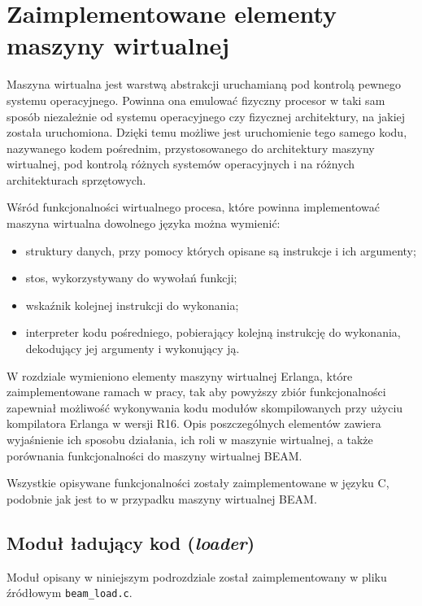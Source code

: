 \chapter{Zaimplementowane elementy maszyny wirtualnej}
\label{cha:maszyna}

Maszyna wirtualna jest warstwą abstrakcji uruchamianą pod kontrolą pewnego systemu operacyjnego.
Powinna ona emulować fizyczny procesor w taki sam sposób niezależnie od systemu operacyjnego czy fizycznej architektury, na jakiej została uruchomiona.
Dzięki temu możliwe jest uruchomienie tego samego kodu, nazywanego kodem pośrednim, przystosowanego do architektury maszyny wirtualnej, pod kontrolą różnych systemów operacyjnych i na różnych architekturach sprzętowych.

Wśród funkcjonalności wirtualnego procesa, które powinna implementować maszyna wirtualna dowolnego języka można wymienić:
\begin{itemize}
\item struktury danych, przy pomocy których opisane są instrukcje i ich argumenty;
\item stos, wykorzystywany do wywołań funkcji;
\item wskaźnik kolejnej instrukcji do wykonania;
\item interpreter kodu pośredniego, pobierający kolejną instrukcję do wykonania, dekodujący jej argumenty i wykonujący ją.
\end{itemize}

W rozdziale wymieniono elementy maszyny wirtualnej Erlanga, które zaimplementowane ramach w pracy, tak aby powyższy zbiór funkcjonalności zapewniał możliwość wykonywania kodu modułów skompilowanych przy użyciu kompilatora Erlanga w wersji R16.
Opis poszczególnych elementów zawiera wyjaśnienie ich sposobu działania, ich roli w maszynie wirtualnej, a także porównania
funkcjonalności do maszyny wirtualnej BEAM.

Wszystkie opisywane funkcjonalności zostały zaimplementowane w języku C, podobnie jak jest to w przypadku maszyny wirtualnej BEAM.

\section{Moduł ładujący kod (\emph{loader})}
\label{sec:maszynaLoader}

Moduł opisany w niniejszym podrozdziale został zaimplementowany w pliku źródłowym \texttt{beam\_load.c}.

